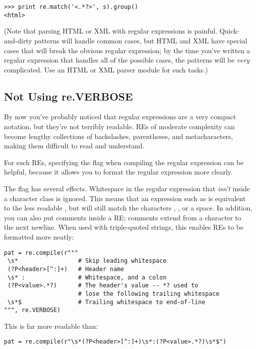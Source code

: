 \documentclass{howto}
\begin{document}
\begin{verbatim}
>>> print re.match('<.*?>', s).group()
<html>
\end{verbatim}

(Note that parsing HTML or XML with regular expressions is painful.
Quick-and-dirty patterns will handle common cases, but HTML and XML
have special cases that will break the obvious regular expression; by
the time you've written a regular expression that handles all of the
possible cases, the patterns will be \emph{very} complicated.  Use an
HTML or XML parser module for such tasks.)

\subsection{Not Using re.VERBOSE}

By now you've probably noticed that regular expressions are a very
compact notation, but they're not terribly readable.  REs of
moderate complexity can become lengthy collections of backslashes,
parentheses, and metacharacters, making them difficult to read and
understand.  

For such REs, specifying the  flag when
compiling the regular expression can be helpful, because it allows
you to format the regular expression more clearly.

The  flag has several effects.  Whitespace in the
regular expression that \emph{isn't} inside a character class is
ignored.  This means that an expression such as  is
equivalent to the less readable , but \regexp{[a b]}
will still match the characters , , or a
space.  In addition, you can also put comments inside a RE; comments
extend from a \samp{\#} character to the next newline.  When used with
triple-quoted strings, this enables REs to be formatted more neatly:

\begin{verbatim}
pat = re.compile(r"""
 \s*                 # Skip leading whitespace
 (?P<header>[^:]+)   # Header name
 \s* :               # Whitespace, and a colon
 (?P<value>.*?)      # The header's value -- *? used to
                     # lose the following trailing whitespace
 \s*$                # Trailing whitespace to end-of-line
""", re.VERBOSE)
\end{verbatim}

This is far more readable than:

\begin{verbatim}
pat = re.compile(r"\s*(?P<header>[^:]+)\s*:(?P<value>.*?)\s*$")
\end{verbatim}
\end{document}
